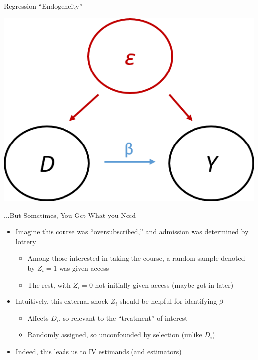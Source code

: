 \documentclass{beamer}
\begin{document}
\begin{frame}{Regression ``Endogeneity''}

\begin{center}
\includegraphics[scale=0.8]{./lecture_includes/dag2.png}
\end{center}

\end{frame}

\begin{frame}{...But Sometimes, You Get What you Need}
\begin{itemize}
\item Imagine this course was ``oversubscribed,'' and admission was determined by lottery\smallskip
\begin{itemize}
\item Among those interested in taking the course, a random sample denoted by $Z_i=1$ was given access\smallskip
\item The rest, with $Z_i=0$ not initially given access (maybe got in later)
\end{itemize}\medskip\pause{}
\item Intuitively, this external shock $Z_i$ should be helpful for identifying $\beta$\smallskip
\begin{itemize}
\item Affects $D_i$, so relevant to the ``treatment'' of interest\smallskip
\item Randomly assigned, so unconfounded by selection (unlike $D_i$)
\end{itemize}\medskip
\item Indeed, this leads us to IV estimands (and estimators)
\end{itemize}
\end{frame}
\end{document}
